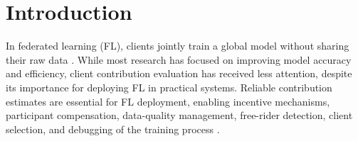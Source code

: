\documentclass[letterpaper]{article} %
\theoremstyle{definition} %
\begin{document}

\section{Introduction}
\label{sec:intro}

In federated learning (FL), clients jointly train a global model without sharing their raw data \citep{mcmahan2016federated,kairouz2021advances}. While most research has focused on improving model accuracy and efficiency, client contribution evaluation has received less attention, despite its importance for deploying FL in practical systems. Reliable contribution estimates are essential for FL deployment, enabling incentive mechanisms, participant compensation, data-quality management, free-rider detection, client selection, and debugging of the training process \citep{zhang2025incentivizing,du2025feddqc,huang2021shapley}.


\end{document}
